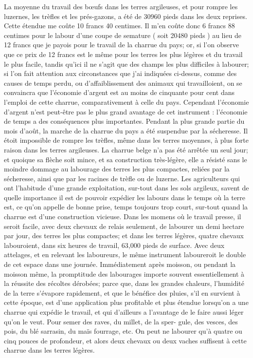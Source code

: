 La moyenne du travail des bœufs dans les terres argileuses, et pour rompre les luzernes, les trèfles et les prés-gazons, a été de 30960 pieds dans les deux reprises. Cette étendue me coûte 10 francs 40 centimes. Il m'en coûte donc 6 francs 88 centimes pour le labour d'une coupe de semature ( soit 20480 pieds ) au lieu de 12 francs que je payois pour le travail de la charrue du pays;\setcounter{page}{398} or, si l'on observe que ce prix de 12 francs est le même pour les terres les plus légères et du travail le plus facile, tandis qu'ici il ne s'agit que des champs les plus difficiles à labourer; si l'on fait attention aux circonstances que j'ai indiquées ci-dessus, comme des causes de temps perdu, ou d'affaiblissement des animaux qui travailloient, on se convaincra que l'économie d'argent est au moins de cinquante pour cent dans l'emploi de cette charrue, comparativement à celle du pays. Cependant l'économie d'argent n'est peut-être pas le plus grand avantage de cet instrument : l'économie de temps a des conséquences plus importantes. Pendant la plus grande partie du mois d'août, la marche de la charrue du pays a été suspendue par la sécheresse. Il étoit impossible de rompre les trèfles, même dans les terres moyennes, à plus forte raison dans les terres argileuses. La charrue belge n'a pas été arrêtée un seul jour; et quoique sa flèche soit mince, et sa construction très-légère, elle a résisté sans le moindre dommage au labourage des terres les plus compactes, reliées par la sécheresse, ainsi que par les racines de trèfle ou de luzerne. Les agriculteurs qui ont l'habitude d'une\setcounter{page}{399} grande exploitation, sur-tout dans les sols argileux, savent de quelle importance il est de pouvoir expédier les labours dans le temps où la terre est, ce qu'on appelle de bonne prise, temps toujours trop court, sur-tout quand la charrue est d'une construction vicieuse. Dans les momens où le travail presse, il seroit facile, avec deux chevaux de relais seulement, de labourer un demi hectare par jour, des terres les plus compactes; et dans les terres légères, quatre chevaux labouroient, dans six heures de travail, 63,000 pieds de surface. Avec deux attelages, et en relevant les laboureurs, le même instrument laboureroit le double de cet espace dans une journée.
Immédiatement après moisson, ou pendant la moisson même, la promptitude des labourages importe souvent essentiellement à la réussite des récoltes dérobées; parce que, dans les grandes chaleurs, l'humidité de la terre s'évapore rapidement, et que le bénéfice des pluies, s'il en survient à cette époque, est d'une application plus profitable et plus étendue lorsqu'on a une charrue qui expédie le travail, et qui d'ailleurs a l'avantage de le faire aussi léger qu'on le veut. Pour semer des raves, du millet, de la sper-\setcounter{page}{400} gule, des vesces, des pois, du blé sarrasin, du maïs fourrage, etc. On peut ne labourer qu'à quatre ou cinq pouces de profondeur, et alors deux chevaux ou deux vaches suffisent à cette charrue dans les terres légères.
